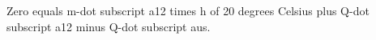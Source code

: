 Zero equals m-dot subscript a12 times h of 20 degrees Celsius plus Q-dot subscript a12 minus Q-dot subscript aus.